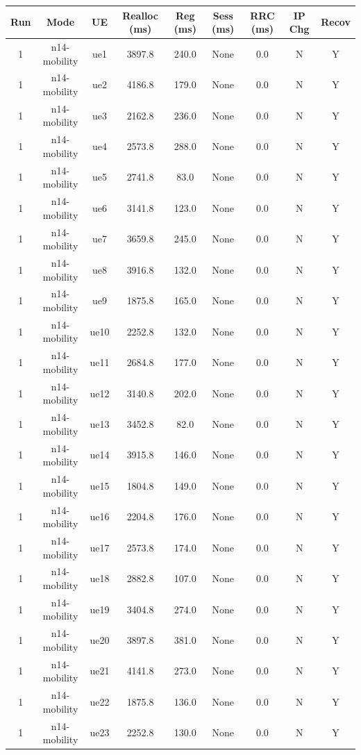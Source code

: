 \begin{table}[ht]
\centering
\begin{tabular}{|c|c|c|c|c|c|c|c|c|}
\hline
Run & Mode & UE & Realloc (ms) & Reg (ms) & Sess (ms) & RRC (ms) & IP Chg & Recov \\
\hline
1 & n14-mobility & ue1 & 3897.8 & 240.0 & None & 0.0 & N & Y \\
1 & n14-mobility & ue2 & 4186.8 & 179.0 & None & 0.0 & N & Y \\
1 & n14-mobility & ue3 & 2162.8 & 236.0 & None & 0.0 & N & Y \\
1 & n14-mobility & ue4 & 2573.8 & 288.0 & None & 0.0 & N & Y \\
1 & n14-mobility & ue5 & 2741.8 & 83.0 & None & 0.0 & N & Y \\
1 & n14-mobility & ue6 & 3141.8 & 123.0 & None & 0.0 & N & Y \\
1 & n14-mobility & ue7 & 3659.8 & 245.0 & None & 0.0 & N & Y \\
1 & n14-mobility & ue8 & 3916.8 & 132.0 & None & 0.0 & N & Y \\
1 & n14-mobility & ue9 & 1875.8 & 165.0 & None & 0.0 & N & Y \\
1 & n14-mobility & ue10 & 2252.8 & 132.0 & None & 0.0 & N & Y \\
1 & n14-mobility & ue11 & 2684.8 & 177.0 & None & 0.0 & N & Y \\
1 & n14-mobility & ue12 & 3140.8 & 202.0 & None & 0.0 & N & Y \\
1 & n14-mobility & ue13 & 3452.8 & 82.0 & None & 0.0 & N & Y \\
1 & n14-mobility & ue14 & 3915.8 & 146.0 & None & 0.0 & N & Y \\
1 & n14-mobility & ue15 & 1804.8 & 149.0 & None & 0.0 & N & Y \\
1 & n14-mobility & ue16 & 2204.8 & 176.0 & None & 0.0 & N & Y \\
1 & n14-mobility & ue17 & 2573.8 & 174.0 & None & 0.0 & N & Y \\
1 & n14-mobility & ue18 & 2882.8 & 107.0 & None & 0.0 & N & Y \\
1 & n14-mobility & ue19 & 3404.8 & 274.0 & None & 0.0 & N & Y \\
1 & n14-mobility & ue20 & 3897.8 & 381.0 & None & 0.0 & N & Y \\
1 & n14-mobility & ue21 & 4141.8 & 273.0 & None & 0.0 & N & Y \\
1 & n14-mobility & ue22 & 1875.8 & 136.0 & None & 0.0 & N & Y \\
1 & n14-mobility & ue23 & 2252.8 & 130.0 & None & 0.0 & N & Y \\

\end{tabular}
\end{table}

